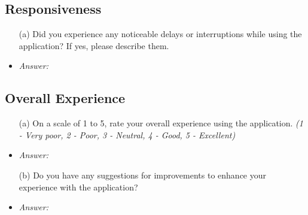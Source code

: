 \documentclass{article}
\begin{document}
\subsection*{\textbf{Responsiveness}}
  \begin{itemize}
    \item[(a)] Did you experience any noticeable delays or interruptions while
    using the application? If yes, please describe them.
    \item \emph{Answer:}
  \end{itemize}

\subsection*{\textbf{Overall Experience}}
  \begin{itemize}
    \item[(a)] On a scale of 1 to 5, rate your overall experience using the
    application. \textit{(1 - Very poor, 2 - Poor, 3 - Neutral, 4 - Good, 5 -
    Excellent)}
    \item \emph{Answer:}
    \item[(b)] Do you have any suggestions for improvements to enhance your
    experience with the application?
    \item \emph{Answer:}
  \end{itemize}
\end{document}
